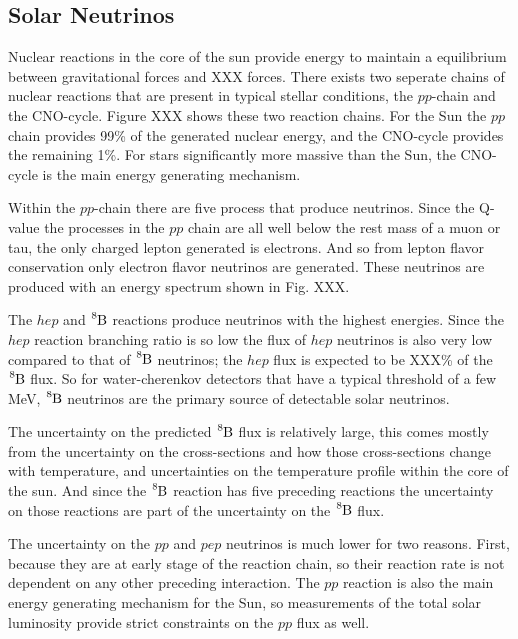 \subsection{Solar Neutrinos}
Nuclear reactions in the core of the sun provide energy to maintain a equilibrium
between gravitational forces and XXX forces.
There exists two seperate chains of nuclear reactions that are present in typical
stellar conditions, the $pp$-chain and the CNO-cycle. Figure XXX shows these
two reaction chains.
For the Sun the $pp$ chain
provides 99\% of the generated nuclear energy, and the CNO-cycle provides the remaining
1\%. For stars significantly more massive than the Sun, the CNO-cycle is the
main energy generating mechanism.

Within the $pp$-chain there are five process that produce neutrinos.
Since the Q-value the processes in the $pp$ chain are all well below the rest mass
of a muon or tau, the only charged lepton generated is electrons. And so from
lepton flavor conservation only electron flavor neutrinos are generated.
These neutrinos are produced with an energy spectrum shown in Fig. XXX.

The $hep$ and $\ce{^{8}B}$ reactions produce neutrinos with the highest
energies. Since the $hep$ reaction branching ratio is so low the flux
of $hep$ neutrinos is also very low compared to that of $\ce{^{8}B}$ neutrinos;
the $hep$ flux is expected to be XXX\% of the $\ce{^{8}B}$ flux.
So for water-cherenkov detectors that have a typical threshold of a few MeV, $\ce{^{8}B}$ neutrinos
are the primary source of detectable solar neutrinos.

The uncertainty on the predicted $\ce{^{8}B}$ flux is relatively large, this comes mostly
from the uncertainty on the cross-sections and how those cross-sections change with
temperature, and uncertainties on the temperature profile within the core of the sun.
And since the $\ce{^{8}B}$ reaction has five preceding reactions the uncertainty on
 those reactions are part of the uncertainty on the $\ce{^{8}B}$ flux.

The uncertainty on the $pp$ and $pep$ neutrinos is much lower for two reasons. First, because
they are at early stage of the reaction chain, so their reaction rate is not dependent on any
other preceding interaction. The $pp$ reaction is also the main energy generating mechanism
for the Sun, so measurements of the total solar luminosity provide strict constraints on the
$pp$ flux as well.

